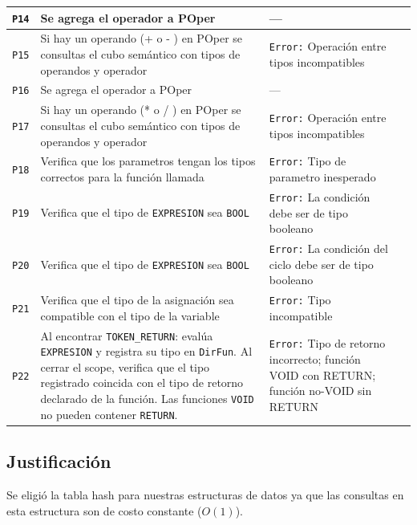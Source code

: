 \documentclass[12pt, letterpaper]{article}
\theoremstyle{definition}
\begin{document}
\begin{longtable}{|p{1cm}|p{5.5cm}|p{4cm}|p{3cm}|}
    \texttt{P14} &
    Se agrega el operador a POper  &
    --- \\ \hline
    \texttt{P15} &
    Si hay un operando (+ o - ) en POper se consultas el cubo semántico con tipos de operandos y operador &
    \texttt{Error:} Operación entre tipos incompatibles \\ \hline
    \texttt{P16} &
    Se agrega el operador a POper  &
    --- \\ \hline
    \texttt{P17} &
    Si hay un operando (* o / ) en POper se consultas el cubo semántico con tipos de operandos y operador &
    \texttt{Error:} Operación entre tipos incompatibles \\ \hline
    \texttt{P18} &
    Verifica que los parametros tengan los tipos correctos para la función llamada&
    \texttt{Error:} Tipo de parametro inesperado \\ \hline
    \texttt{P19} & 
    Verifica que el tipo de \texttt{EXPRESION} sea \texttt{BOOL} &
    \texttt{Error:} La condición debe ser de tipo booleano \\ \hline
    \texttt{P20} &
    Verifica que el tipo de \texttt{EXPRESION} sea \texttt{BOOL} &
    \texttt{Error:} La condición del ciclo debe ser de tipo booleano \\ \hline
    \texttt{P21} &
    Verifica que el tipo de la asignación sea compatible con el tipo de la variable &
    \texttt{Error:} Tipo incompatible \\ \hline
    \texttt{P22} &
    Al encontrar \texttt{TOKEN\_RETURN}: evalúa \texttt{EXPRESION} y registra su tipo en \texttt{DirFun}. Al cerrar el scope, verifica que el tipo registrado coincida con el tipo de retorno declarado de la función. Las funciones \texttt{VOID} no pueden contener \texttt{RETURN}. &
    \texttt{Error:} Tipo de retorno incorrecto; función VOID con RETURN; función no-VOID sin RETURN \\ \hline
\end{longtable}

\subsection{Justificación}

Se eligió la tabla hash para nuestras estructuras de datos ya  que las consultas en esta estructura son de costo constante ($O(1)$).
\end{document}
